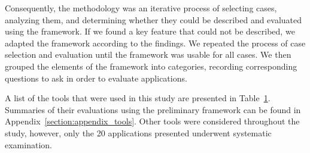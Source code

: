 \documentclass{sigchi}
\begin{document}
{Consequently, the methodology was an iterative process of selecting cases, analyzing them, and determining whether they could be described and evaluated using the framework. If we found a key feature that could not be described, we adapted the framework according to the findings. We repeated the process of case selection and evaluation until the framework was usable for all cases. We then grouped the elements of the framework into categories, recording corresponding questions to ask in order to evaluate applications. 

A list of the tools that were used in this study are presented in Table~\ref{table:tools}. Summaries of their evaluations using the preliminary framework can be found in Appendix~\ref{section:appendix_tools}. Other tools were considered throughout the study, however, only the 20 applications presented underwent systematic examination. 

\begin{table}[htbp]
\small

\label{table:tools} 

\begin{tabular}{|p{}| p{}| p{}|}


\end{tabular}
\end{table}}
\end{document}
